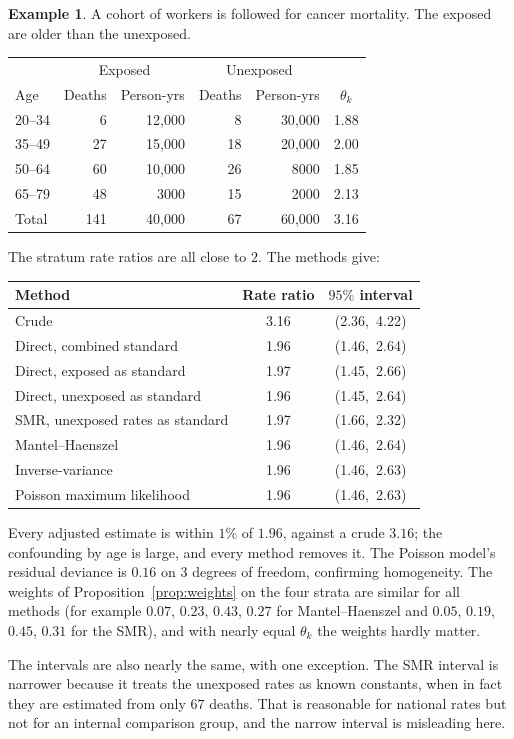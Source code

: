 \documentclass[11pt,a4paper]{article}
\numberwithin{equation}{section}
\theoremstyle{definition}
\newtheorem{exa}[thm]{Example}
\begin{document}
\begin{exa}
\label{exa:cmp1}
A cohort of workers is followed for cancer mortality. The exposed are older than the unexposed.
\begin{center}
\begin{tabular}{lrrrrc}
\hline
 & \multicolumn{2}{c}{Exposed} & \multicolumn{2}{c}{Unexposed} & \\
Age & Deaths & Person-yrs & Deaths & Person-yrs & $\theta_k$ \\
\hline
20--34 & 6 & 12{,}000 & 8 & 30{,}000 & 1.88 \\
35--49 & 27 & 15{,}000 & 18 & 20{,}000 & 2.00 \\
50--64 & 60 & 10{,}000 & 26 & 8000 & 1.85 \\
65--79 & 48 & 3000 & 15 & 2000 & 2.13 \\
\hline
Total & 141 & 40{,}000 & 67 & 60{,}000 & 3.16 \\
\hline
\end{tabular}
\end{center}
The stratum rate ratios are all close to $2$. The methods give:
\begin{center}
\begin{tabular}{lcc}
\hline
Method & Rate ratio & $95\%$ interval \\
\hline
Crude & 3.16 & (2.36,\ 4.22) \\
Direct, combined standard & 1.96 & (1.46,\ 2.64) \\
Direct, exposed as standard & 1.97 & (1.45,\ 2.66) \\
Direct, unexposed as standard & 1.96 & (1.45,\ 2.64) \\
SMR, unexposed rates as standard & 1.97 & (1.66,\ 2.32) \\
Mantel--Haenszel & 1.96 & (1.46,\ 2.64) \\
Inverse-variance & 1.96 & (1.46,\ 2.63) \\
Poisson maximum likelihood & 1.96 & (1.46,\ 2.63) \\
\hline
\end{tabular}
\end{center}
Every adjusted estimate is within $1\%$ of $1.96$, against a crude $3.16$; the confounding by age is large, and every method removes it. The
Poisson model's residual deviance is $0.16$ on $3$ degrees of freedom, confirming homogeneity. The weights of Proposition~\ref{prop:weights} on
the four strata are similar for all methods (for example $0.07$, $0.23$, $0.43$, $0.27$ for Mantel--Haenszel and $0.05$, $0.19$, $0.45$, $0.31$ for the SMR), and
with nearly equal $\theta_k$ the weights hardly matter.

The intervals are also nearly the same, with one exception. The SMR interval is narrower because it treats the unexposed rates as known
constants, when in fact they are estimated from only $67$ deaths. That is reasonable for national rates but not for an internal comparison
group, and the narrow interval is misleading here.
\end{exa}
\end{document}
